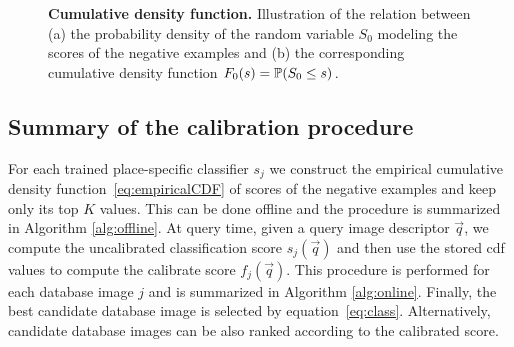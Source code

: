       \begin{figure}[t]
         \vspace*{-3mm}
         \caption{
         \textbf{Cumulative density function.}
         Illustration of the relation between (a) the probability density of the random variable $S_0$ modeling the scores of the negative examples and (b) the corresponding cumulative density function $F_0(s)=\mathbb{P}(S_0 \leq s)$.
         }
               \vspace*{-3mm}
         \label{fig:qntExample}
      \end{figure}
      
      
   \subsection{Summary of the calibration procedure}
    
    For each trained place-specific classifier $s_j$ we construct the empirical cumulative density function~\eqref{eq:empiricalCDF} of scores of the negative examples and keep only its top $K$ values. This can be done offline and the procedure is summarized in Algorithm \ref{alg:offline}. 
    At query time, given a query image descriptor $\vec{q}$, we compute the uncalibrated classification score $s_j(\vec{q})$ and then use the stored cdf values to compute the calibrate score $f_j(\vec{q})$. This procedure is performed for each database image $j$ and is summarized in Algorithm \ref{alg:online}.
    Finally, the best candidate database image is selected by equation~\eqref{eq:class}. Alternatively, candidate database images can be also ranked according to the calibrated score.
 
